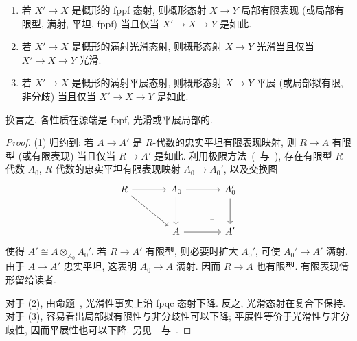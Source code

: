 \begin{proposition}\label{src:3.1.27}
\begin{enumerate}
\item 若 $X'\to X$ 是概形的 fppf 态射, 则概形态射 $X\to Y$ 局部有限表现 (或局部有限型, 满射, 平坦, fppf) 当且仅当 $X'\to X\to Y$ 是如此.
\item 若 $X'\to X$ 是概形的满射光滑态射, 则概形态射 $X\to Y$ 光滑当且仅当 $X'\to X\to Y$ 光滑.
\item 若 $X'\to X$ 是概形的满射平展态射, 则概形态射 $X\to Y$ 平展 (或局部拟有限, 非分歧) 当且仅当 $X'\to X\to Y$ 是如此.
\end{enumerate}
换言之, 各性质在源端是 fppf, 光滑或平展局部的.
\end{proposition}
\begin{proof}
(1) 归约到: 若 $A\to A'$ 是 $R$-代数的忠实平坦有限表现映射, 则 $R\to A$ 有限型 (或有限表现) 当且仅当 $R\to A'$ 是如此. 利用极限方法~(~与~), 存在有限型 $R$-代数 $A_0$, $R$-代数的忠实平坦有限表现映射 $A_0\to A_0'$, 以及交换图
\[
\begin{tikzcd}[column sep=large,row sep=large]
R\arrow[r]\arrow[dr]&A_0\arrow[r]\arrow[d]&A_0'\arrow[d]\\
&A\arrow[r]&A'\arrow[ul,phantom,"\lrcorner",near start]
\end{tikzcd}
\]
使得 $A'\cong A\otimes_{A_0}A_0'$. 若 $R\to A'$ 有限型, 则必要时扩大 $A_0'$, 可使 $A_0'\to A'$ 满射. 由于 $A\to A'$ 忠实平坦, 这表明 $A_0\to A$ 满射. 因而 $R\to A$ 也有限型. 有限表现情形留给读者.

对于 (2), 由命题~, 光滑性事实上沿 fpqc 态射下降. 反之, 光滑态射在复合下保持.
对于 (3), 容易看出局部拟有限性与非分歧性可以下降; 平展性等价于光滑性与非分歧性, 因而平展性也可以下降. 另见~\cite[IV4.17.7.5]{EGA}~与~\cite[Tags 036M, 036T, 036V]{SP}.
\end{proof}
